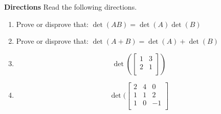 \documentclass[12pt]{article}
\begin{document}
\textbf{Directions} Read the following directions. 
\begin{enumerate}
    \item Prove or disprove that: $\det(AB) = \det(A)\det(B)$
    \vspace{4cm}
    \item Prove or disprove that: $\det(A + B) = \det(A) + \det(B)$
    \vspace{4cm}
    \item 
    $$ \det (\begin{bmatrix} 
    1 & 3 \\
    2 & 1 \\
    \end{bmatrix}) $$
    \item $$ \det(\begin{bmatrix} 
    2 & 4 & 0 \\
    1 & 1 & 2 \\
    1 & 0 & -1 \\
    \end{bmatrix}$$
\end{enumerate}
\end{document}
